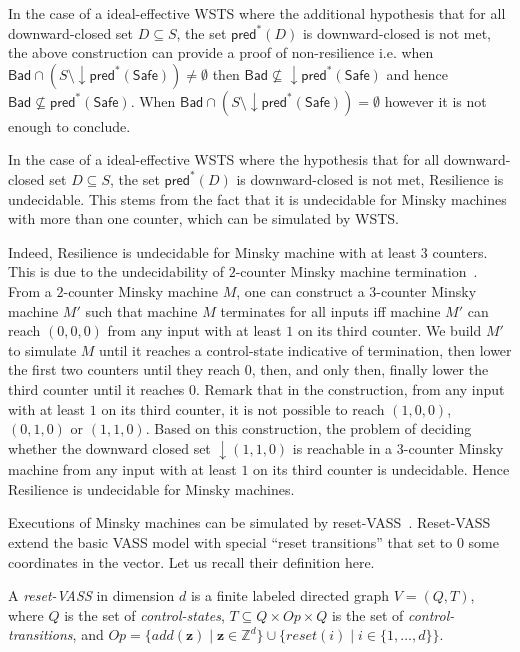 \documentclass[runningheads]{llncs}
\newcommand{\pred}{\textsf{pred}}
\newcommand{\Bad}{\textsf{Bad}}
\newcommand{\Safe}{\textsf{Safe}}
\begin{document}
In the case
of a ideal-effective WSTS 
where
the additional hypothesis that
for all downward-closed set $D \subseteq S$, the set $\pred^*(D)$ is downward-closed
is not met,
the above construction
can provide a proof
of non-resilience
i.e. when
$\Bad \cap (S \setminus \downarrow\pred^*(\Safe)) \neq \emptyset$
then
$\Bad \not\subseteq \downarrow\pred^*(\Safe)$
and hence
$\Bad \not\subseteq \pred^*(\Safe)$.
When $\Bad \cap (S \setminus \downarrow\pred^*(\Safe)) = \emptyset$
however
it is not enough to conclude.



In the case
of a ideal-effective WSTS 
where the hypothesis that
{for all downward-closed set $D \subseteq S$, the set $\pred^*(D)$ is downward-closed}
is not met, {\sc Resilience} is undecidable.
This stems from the fact that it is undecidable for Minsky machines with more than one counter,
which can be simulated by WSTS.



Indeed, {\sc Resilience} is undecidable for Minsky machine with at least $3$ counters.
This is due to the undecidability of $2$-counter Minsky machine termination~\cite{Min61,Min67}.
From a $2$-counter Minsky machine $M$, one can construct a $3$-counter Minsky machine $M'$ 
such that machine $M$ terminates for all inputs iff machine $M'$ can reach $(0,0,0)$ from any input with at least $1$ on its third counter. We build $M'$ to simulate $M$ until it reaches a control-state indicative of termination, then lower the first two counters until they reach $0$, then, and only then, finally lower the third counter until it reaches $0$.
Remark that in the construction, from any input with at least $1$ on its third counter, it is not possible to reach $(1,0,0)$, $(0,1,0)$ or $(1,1,0)$.
Based on this construction, the problem of deciding whether the downward closed set $\downarrow (1,1,0)$ is reachable in a $3$-counter Minsky machine
from any input with at least $1$ on its third counter is undecidable. 
Hence {\sc Resilience} is undecidable for Minsky machines.


Executions of Minsky machines can be simulated by reset-VASS~\cite{araki1976PN}. 
Reset-VASS extend the basic VASS model with special “reset
transitions” that set to $0$ some coordinates in the vector. Let us recall their definition here.
\begin{definition}
A {\em reset-VASS} in dimension $d$ 
 is a finite 
labeled directed graph $V = (Q,T)$, where $Q$ is the set of {\em control-states}, 
$T \subseteq Q \times Op \times Q$
is the set of {\em control-transitions}, and $Op = \{ add(\textbf{z}) \mid \textbf{z} \in \mathds{Z}^d\} \cup 
		\{ reset(i) \mid i \in \{1,\ldots,d\} \}$.
\end{definition}
\end{document}

